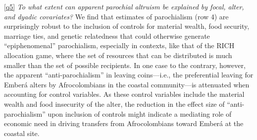 \documentclass[bibauthoryear]{aa}
\begin{document}
\ref{q5} \emph{To what extent can apparent parochial altruism be explained by focal, alter, and dyadic covariates?}
We find that estimates of parochialism (row 4) are surprisingly robust to the inclusion of controls for material wealth, food security, marriage ties, and genetic relatedness that could otherwise generate ``epiphenomenal'' parochialism, especially in contexts, like that of the RICH allocation game, where the set of resources that can be distributed is much smaller than the set of possible recipients. In one case to the contrary, however, the apparent  ``anti-parochialism'' in leaving coins---i.e., the preferential leaving for Ember\'a alters by Afrocolombians in the coastal community---is attenuated when accounting for control variables. As these control variables include the material wealth and food insecurity of the alter, the reduction in the effect size of ``anti-parochialism'' upon inclusion of controls might indicate a mediating role of economic need in driving transfers from Afrocolombians toward Ember\'a at the coastal site.
\end{document}
